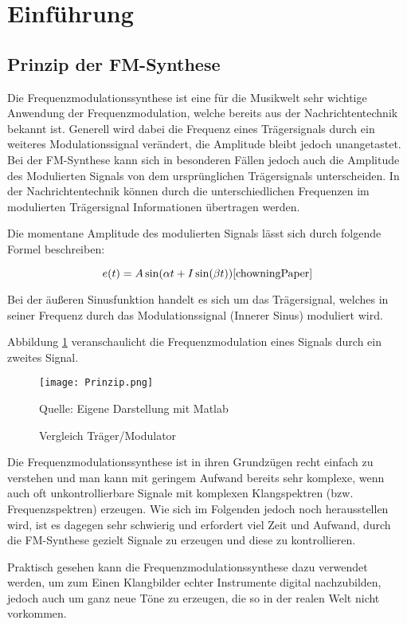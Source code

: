\section{Einführung}

\subsection{Prinzip der FM-Synthese}
Die Frequenzmodulationssynthese ist eine für die Musikwelt sehr wichtige Anwendung der Frequenzmodulation, welche bereits aus der Nachrichtentechnik bekannt ist. Generell wird dabei die Frequenz eines Trägersignals durch ein weiteres Modulationssignal verändert, die Amplitude bleibt jedoch unangetastet. Bei der FM-Synthese kann sich in besonderen Fällen jedoch auch die Amplitude des Modulierten Signals von dem ursprünglichen Trägersignals unterscheiden. In der Nachrichtentechnik können durch die unterschiedlichen Frequenzen im modulierten Trägersignal Informationen übertragen werden. 

Die momentane Amplitude des modulierten Signals lässt sich durch folgende Formel beschreiben:

\[
e(t) = A\sin(\alpha t + I\sin(\beta t)) \cite{chowningPaper}
\]

Bei der äußeren Sinusfunktion handelt es sich um das Trägersignal, welches in seiner Frequenz durch das Modulationssignal (Innerer Sinus) moduliert wird.

Abbildung \ref{fig:vergleichSignale} veranschaulicht die Frequenzmodulation eines Signals durch ein zweites Signal.

\begin{figure} [ht]
\centering
  \texttt{[image: Prinzip.png]}
\caption{Vergleich Träger/Modulator}
\label{fig:vergleichSignale}
Quelle: Eigene Darstellung mit Matlab
\end{figure}

Die Frequenzmodulationssynthese ist in ihren Grundzügen recht einfach zu verstehen und man kann mit geringem Aufwand bereits sehr komplexe, wenn auch oft unkontrollierbare Signale mit komplexen Klangspektren (bzw. Frequenzspektren) erzeugen. Wie sich im Folgenden jedoch noch herausstellen wird, ist es dagegen sehr schwierig und erfordert viel Zeit und Aufwand, durch die FM-Synthese gezielt Signale zu erzeugen und diese zu kontrollieren.

Praktisch gesehen kann die Frequenzmodulationssynthese dazu verwendet werden, um zum Einen Klangbilder echter Instrumente digital nachzubilden, jedoch auch um ganz neue Töne zu erzeugen, die so in der realen Welt nicht vorkommen.

